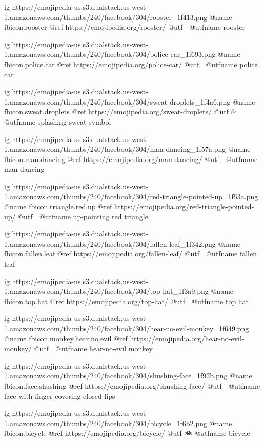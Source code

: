   ig https://emojipedia-us.s3.dualstack.us-west-1.amazonaws.com/thumbs/240/facebook/304/rooster_1f413.png
  @name fbicon.rooster
  @ref https://emojipedia.org/rooster/
  @utf 🐓
  @utfname rooster

  ig https://emojipedia-us.s3.dualstack.us-west-1.amazonaws.com/thumbs/240/facebook/304/police-car_1f693.png
  @name fbicon.police.car
  @ref https://emojipedia.org/police-car/
  @utf 🚓
  @utfname police car

  ig https://emojipedia-us.s3.dualstack.us-west-1.amazonaws.com/thumbs/240/facebook/304/sweat-droplets_1f4a6.png
  @name fbicon.sweat.droplets
  @ref https://emojipedia.org/sweat-droplets/
  @utf 💦
  @utfname splashing sweat symbol

  ig https://emojipedia-us.s3.dualstack.us-west-1.amazonaws.com/thumbs/240/facebook/304/man-dancing_1f57a.png
  @name fbicon.man.dancing
  @ref https://emojipedia.org/man-dancing/
  @utf 🕺
  @utfname man dancing

  ig https://emojipedia-us.s3.dualstack.us-west-1.amazonaws.com/thumbs/240/facebook/304/red-triangle-pointed-up_1f53a.png
  @name fbicon.triangle.red.up
  @ref https://emojipedia.org/red-triangle-pointed-up/
  @utf 🔺
  @utfname up-pointing red triangle

  ig https://emojipedia-us.s3.dualstack.us-west-1.amazonaws.com/thumbs/240/facebook/304/fallen-leaf_1f342.png
  @name fbicon.fallen.leaf
  @ref https://emojipedia.org/fallen-leaf/
  @utf 🍂
  @utfname fallen leaf

  ig https://emojipedia-us.s3.dualstack.us-west-1.amazonaws.com/thumbs/240/facebook/304/top-hat_1f3a9.png
  @name fbicon.top.hat
  @ref https://emojipedia.org/top-hat/
  @utf 🎩
  @utfname top hat

  ig https://emojipedia-us.s3.dualstack.us-west-1.amazonaws.com/thumbs/240/facebook/304/hear-no-evil-monkey_1f649.png
  @name fbicon.monkey.hear.no.evil
  @ref https://emojipedia.org/hear-no-evil-monkey/
  @utf 🙉
  @utfname hear-no-evil monkey

  ig https://emojipedia-us.s3.dualstack.us-west-1.amazonaws.com/thumbs/240/facebook/304/shushing-face_1f92b.png
  @name fbicon.face.shushing
  @ref https://emojipedia.org/shushing-face/
  @utf 🤫
  @utfname face with finger covering closed lips

  ig https://emojipedia-us.s3.dualstack.us-west-1.amazonaws.com/thumbs/240/facebook/304/bicycle_1f6b2.png
  @name fbicon.bicycle
  @ref https://emojipedia.org/bicycle/
  @utf 🚲
  @utfname bicycle

